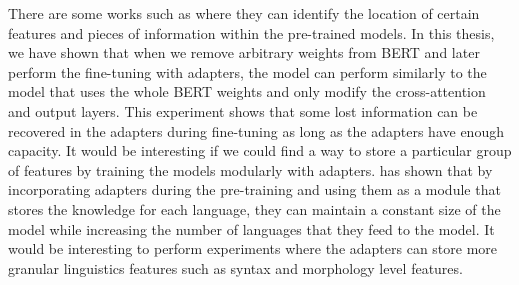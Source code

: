 There are some works such as  where they can identify the location of certain features and pieces of information within the pre-trained models. In this thesis, we have shown that when we remove arbitrary weights from BERT and later perform the fine-tuning with adapters, the model can perform similarly to the model that uses the whole BERT weights and only modify the cross-attention and output layers. This experiment shows that some lost information can be recovered in the adapters during fine-tuning as long as the adapters have enough capacity. It would be interesting if we could find a way to store a particular group of features by training the models modularly with adapters.  has shown that by incorporating adapters during the pre-training and using them as a module that stores the knowledge for each language, they can maintain a constant size of the model while increasing the number of languages that they feed to the model. It would be interesting to perform experiments where the adapters can store more granular linguistics features such as syntax and morphology level features.